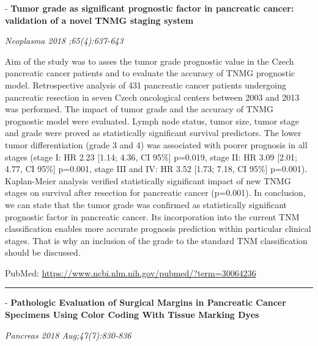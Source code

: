 \documentclass[]{article}
\begin{document}
 - \textbf{Tumor grade as significant prognostic factor in pancreatic
cancer: validation of a novel TNMG staging system}

\emph{Neoplasma 2018 ;65(4):637-643}

Aim of the study was to asses the tumor grade prognostic value in the
Czech pancreatic cancer patients and to evaluate the accuracy of TNMG
prognostic model. Retrospective analysis of 431 pancreatic cancer
patients undergoing pancreatic resection in seven Czech oncological
centers between 2003 and 2013 was performed. The impact of tumor grade
and the accuracy of TNMG prognostic model were evaluated. Lymph node
status, tumor size, tumor stage and grade were proved as statistically
significant survival predictors. The lower tumor differentiation (grade
3 and 4) was associated with poorer prognosis in all stages (stage I: HR
2.23 {[}1.14; 4.36, CI 95\%{]} p=0.019, stage II: HR 3.09 {[}2.01; 4.77,
CI 95\%{]} p=0.001, stage III and IV: HR 3.52 {[}1.73; 7.18, CI 95\%{]}
p=0.001). Kaplan-Meier analysis verified statistically significant
impact of new TNMG stages on survival after resection for pancreatic
cancer (p=0.001). In conclusion, we can state that the tumor grade was
confirmed as statistically significant prognostic factor in pancreatic
cancer. Its incorporation into the current TNM classification enables
more accurate prognosis prediction within particular clinical stages.
That is why an inclusion of the grade to the standard TNM classification
should be discussed.

PubMed: \url{https://www.ncbi.nlm.nih.gov/pubmed/?term=30064236}

{}

{}

\begin{center}\rule{0.5\linewidth}{\linethickness}\end{center}

 - \textbf{Pathologic Evaluation of Surgical Margins in Pancreatic
Cancer Specimens Using Color Coding With Tissue Marking Dyes}

\emph{Pancreas 2018 Aug;47(7):830-836}
\end{document}
